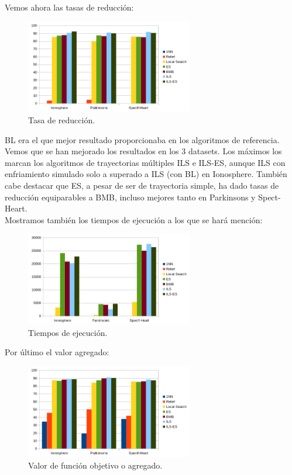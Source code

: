 \documentclass[11pt,a4paper]{article}
\theoremstyle{definition}
\begin{document}
	
	Vemos ahora las tasas de reducción:

	\begin{figure}[H]
		\centering
		\includegraphics[width=0.65\textwidth]{images/tasa_red.png}
		\caption{Tasa de reducción.}
	\end{figure}
	
	BL era el que mejor resultado proporcionaba en los algoritmos de referencia. Vemos que se han mejorado los resultados en los 3 datasets. Los máximos los marcan los algoritmos de trayectorias múltiples ILS e ILS-ES, aunque ILS con enfriamiento simulado solo a superado a ILS (con BL) en Ionosphere. También cabe destacar que ES, a pesar de ser de trayectoria simple, ha dado tasas de reducción equiparables a BMB, incluso mejores tanto en Parkinsons y Spect-Heart. ~\\
	
	Mostramos también los tiempos de ejecución a los que se hará mención:
	
	\begin{figure}[H]
		\centering
		\includegraphics[width=0.65\textwidth]{images/tiempos.png}
		\caption{Tiempos de ejecución.}
	\end{figure}
	
	Por último el valor agregado:
	\begin{figure}[H]
		\centering
		\includegraphics[width=0.65\textwidth]{images/tasa_agr.png}
		\caption{Valor de función objetivo o agregado.}
	\end{figure}
\end{document}
